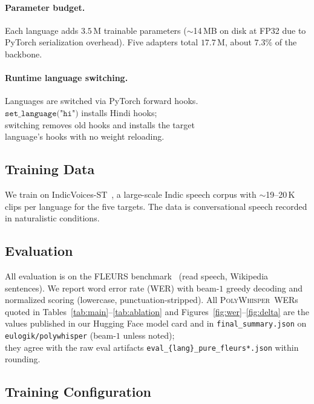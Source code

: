 \documentclass[11pt,a4paper]{article}
\newcommand{\poly}{\textsc{PolyWhisper}}
\begin{document}
\paragraph{Parameter budget.}
Each language adds $3.5$\,M trainable parameters ($\sim$14\,MB on disk at FP32 due to PyTorch serialization overhead).
Five adapters total $17.7$\,M, about $7.3\%$ of the backbone.

\paragraph{Runtime language switching.}
Languages are switched via PyTorch forward hooks.\\
$\texttt{set\_language("hi")}$ installs Hindi hooks;\\
switching removes old hooks and installs the target\\
language's hooks with no weight reloading.

\subsection{Training Data}

We train on IndicVoices-ST~\cite{javed2024sravaani}, a large-scale Indic speech corpus with $\sim$19--20\,K clips per language for the five targets.
The data is conversational speech recorded in naturalistic conditions.

\subsection{Evaluation}
\label{sec:eval}

All evaluation is on the FLEURS benchmark~\cite{conneau2022fleurs} (read speech, Wikipedia sentences).
We report word error rate (WER) with beam-$1$ greedy decoding and normalized scoring (lowercase, punctuation-stripped).
All \poly\ WERs quoted in Tables~\ref{tab:main}--\ref{tab:ablation} and
Figures~\ref{fig:wer}--\ref{fig:delta} are the values published in our
Hugging Face model card and in \texttt{final\_summary.json} on
\texttt{eulogik/polywhisper} (beam-$1$ unless noted);\\
they agree with the raw eval artifacts
\texttt{eval\_\{lang\}\_pure\_fleurs*.json} within
rounding.

\subsection{Training Configuration}
\end{document}
